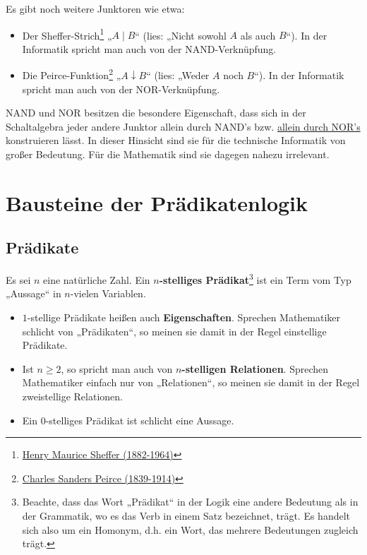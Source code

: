 	
\begin{vorschau}
    Es gibt noch weitere Junktoren wie etwa:
    \begin{itemize}
        \item Der Sheffer-Strich\footnote{\href{https://de.wikipedia.org/wiki/Henry_Maurice_Sheffer}{Henry Maurice Sheffer (1882-1964)}} „$A\mid B$“ (lies: „Nicht sowohl $A$ als auch $B$“). In der Informatik spricht man auch von der NAND-Verknüpfung.
        \item Die Peirce-Funktion\footnote{\href{https://de.wikipedia.org/wiki/Charles_Sanders_Peirce}{Charles Sanders Peirce (1839-1914)}} „$A\downarrow B$“ (lies: „Weder $A$ noch $B$“). In der Informatik spricht man auch von der NOR-Verknüpfung.
    \end{itemize}
    NAND und NOR besitzen die besondere Eigenschaft, dass sich in der Schaltalgebra jeder andere Junktor allein durch NAND's bzw. \href{https://de.wikipedia.org/wiki/NOR-Gatter#Logiksynthese}{allein durch NOR's} konstruieren lässt. In dieser Hinsicht sind sie für die technische Informatik von großer Bedeutung. Für die Mathematik sind sie dagegen nahezu irrelevant.
\end{vorschau}




	
\section{Bausteine der Prädikatenlogik}


\subsection*{Prädikate}


\begin{de}[Prädikat] \label{def:praedikat}  
    Es sei $n$ eine natürliche Zahl. Ein \textbf{$n$-stelliges Prädikat}\footnote{Beachte, dass das Wort „Prädikat“ in der Logik eine andere Bedeutung als in der Grammatik, wo es das Verb in einem Satz bezeichnet, trägt. Es handelt sich also um ein Homonym, d.h. ein Wort, das mehrere Bedeutungen zugleich trägt.} ist ein Term vom Typ „Aussage“ in $n$-vielen Variablen.
    \begin{itemize}
        \item $1$-stellige Prädikate heißen auch \textbf{Eigenschaften}. Sprechen Mathematiker schlicht von „Prädikaten“, so meinen sie damit in der Regel einstellige Prädikate.
        \item Ist $n\ge 2$, so spricht man auch von \textbf{$n$-stelligen Relationen}. Sprechen Mathematiker einfach nur von „Relationen“, so meinen sie damit in der Regel zweistellige Relationen.
        \item Ein $0$-stelliges Prädikat ist schlicht eine Aussage.
    \end{itemize}
\end{de}


